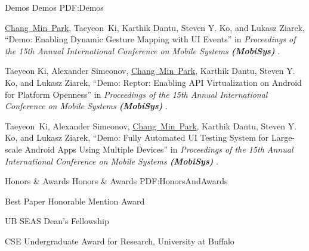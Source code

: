 \documentclass[letterpaper,MMMyyyy,nonstopmode]{simpleresumecv}
\begin{document}
\begin{Body}
\BigGap
\SubSection
{Demos}
{Demos}
{PDF:Demos}

\begingroup
\renewcommand{\MaxNumberedItem}{[88]}

\BigGap
\NumberedItem{[1]}
\underline{Chang~Min~Park}, Taeyeon~Ki, Karthik Dantu, Steven Y. Ko, and Lukasz Ziarek, 
``Demo: Enabling Dynamic Gesture Mapping with UI Events'' in
\textit{Proceedings of the 15th Annual International Conference on Mobile Systems \textbf{(MobiSys)}
}.

\Gap
\NumberedItem{[2]}
Taeyeon Ki, Alexander Simeonov, \underline{Chang~Min~Park}, Karthik Dantu, Steven Y. Ko, 
and Lukasz Ziarek, 
``Demo: Reptor: Enabling API Virtualization on Android for Platform Openness'' in
\textit{Proceedings of the 15th Annual International Conference on Mobile Systems \textbf{(MobiSys)}
}.

\Gap
\NumberedItem{[3]}
Taeyeon~Ki, Alexander Simeonov, \underline{Chang~Min~Park}, Karthik Dantu, 
Steven Y. Ko, and Lukasz Ziarek, 
``Demo: Fully Automated UI Testing System for Large-scale Android Apps Using Multiple 
Devices'' in
\textit{Proceedings of the 15th Annual International Conference on Mobile Systems \textbf{(MobiSys)}
}.




\Section
{Honors \&\newline
Awards}
{Honors \& Awards}
{PDF:HonorsAndAwards}

\BulletItem
Best Paper Honorable Mention Award
\hfill
{}

\Gap
\BulletItem
UB SEAS Dean’s Fellowship
\hfill
{}

\Gap
\BulletItem
CSE Undergraduate Award for Research, University at Buffalo
\hfill
{}


\end{Body}
\end{document}
